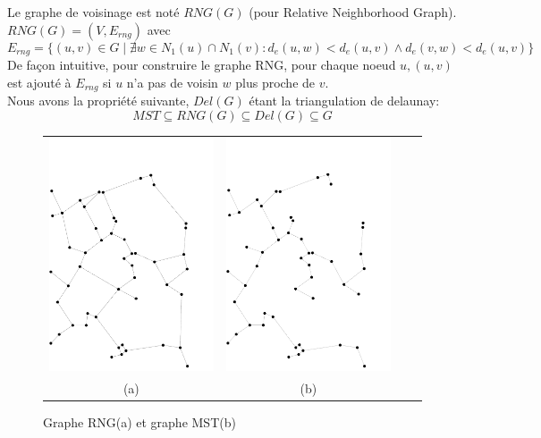 \begin{mydef}
 Le graphe de voisinage est noté $RNG(G)$ (pour Relative Neighborhood Graph).\\
 $RNG(G)=(V,E_{rng})$ avec $$E_{rng}=\{ (u,v)\in G \mid \nexists w\in N_1(u)\cap N_1(v): d_e(u,w)<d_e(u,v) \wedge d_e(v,w)<d_e(u,v)  \}$$
 De façon intuitive, pour construire le graphe RNG, pour chaque noeud $u,(u,v)$ est ajouté à $E_{rng}$ si $u$ n'a pas de voisin $w$ plus proche de $v$.\\
 Nous avons la propriété suivante, $Del(G)$ étant la triangulation de delaunay: $$  MST\subseteq RNG(G)\subseteq Del(G) \subseteq G$$

\end{mydef}

\begin{figure}[tb]
    \centering
    \begin{tabular}{cccc}
      
      \includegraphics[angle=90, scale= 0.5,width=.5\linewidth]{Etat_de_l'art/source/GrapheRNG.pdf} &
      \includegraphics[angle=90, scale= 0.5,width=.5\linewidth]{Etat_de_l'art/source/GrapheMST.pdf} 
   \\
      (a) & (b) \\
    \end{tabular}
    \caption{Graphe RNG(a) et graphe MST(b) \label{fig:ex}}
\end{figure}


